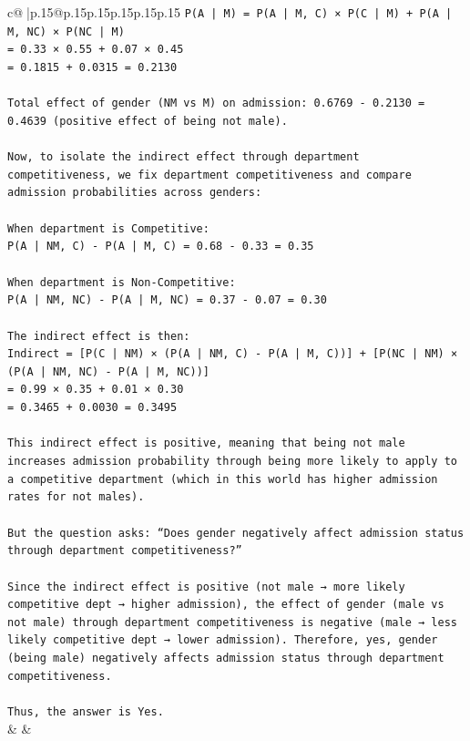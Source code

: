 \documentclass{article}
\begin{document}
{\begin{supertabular}{c@{$\;$}|p{.15\linewidth}@{}p{.15\linewidth}p{.15\linewidth}p{.15\linewidth}p{.15\linewidth}p{.15\linewidth}}
{{{\texttt{P(A | M) = P(A | M, C) × P(C | M) + P(A | M, NC) × P(NC | M)} \\
\texttt{= 0.33 × 0.55 + 0.07 × 0.45} \\
\texttt{= 0.1815 + 0.0315 = 0.2130} \\
\\ 
\texttt{Total effect of gender (NM vs M) on admission: 0.6769 {-} 0.2130 = 0.4639 (positive effect of being not male).} \\
\\ 
\texttt{Now, to isolate the indirect effect through department competitiveness, we fix department competitiveness and compare admission probabilities across genders:} \\
\\ 
\texttt{When department is Competitive:} \\
\texttt{P(A | NM, C) {-} P(A | M, C) = 0.68 {-} 0.33 = 0.35} \\
\\ 
\texttt{When department is Non{-}Competitive:} \\
\texttt{P(A | NM, NC) {-} P(A | M, NC) = 0.37 {-} 0.07 = 0.30} \\
\\ 
\texttt{The indirect effect is then:} \\
\texttt{Indirect = {[}P(C | NM) × (P(A | NM, C) {-} P(A | M, C)){]} + {[}P(NC | NM) × (P(A | NM, NC) {-} P(A | M, NC)){]}} \\
\texttt{= 0.99 × 0.35 + 0.01 × 0.30} \\
\texttt{= 0.3465 + 0.0030 = 0.3495} \\
\\ 
\texttt{This indirect effect is positive, meaning that being not male increases admission probability through being more likely to apply to a competitive department (which in this world has higher admission rates for not males).} \\
\\ 
\texttt{But the question asks: “Does gender negatively affect admission status through department competitiveness?”} \\
\\ 
\texttt{Since the indirect effect is positive (not male → more likely competitive dept → higher admission), the effect of gender (male vs not male) through department competitiveness is negative (male → less likely competitive dept → lower admission). Therefore, yes, gender (being male) negatively affects admission status through department competitiveness.} \\
\\ 
\texttt{Thus, the answer is Yes.} \\
            }
        }
    }
    & & \\ \\


\end{supertabular}}
\end{document}
